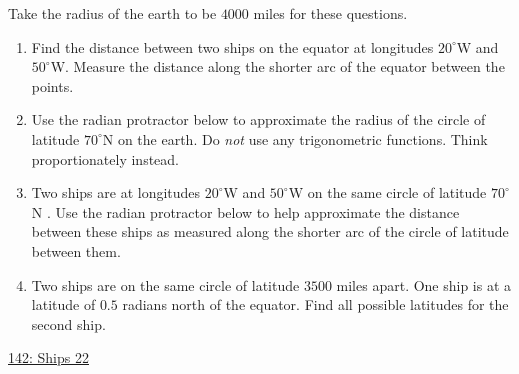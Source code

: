 \documentclass{ximera}
\begin{document}
\begin{question} \label{QPPPdfrrr3r54g}
Take the radius of the earth to be $4000$ miles for these questions.

\begin{enumerate}
\item Find the distance between two ships on the equator at longitudes $20^\circ$W and $50^\circ$W. Measure the distance along the shorter arc of the equator between the points. %

\item Use the radian protractor below to approximate the radius of the circle of latitude $70^\circ$N on the earth. Do \emph{not} use any trigonometric functions. Think proportionately instead.

\item Two ships are at longitudes $20^\circ$W and $50^\circ$W on the same circle of latitude $70^\circ$N . Use the radian protractor below to help approximate the distance between these ships as measured along the shorter arc of the circle of latitude between them.

\item Two ships are on the same circle of latitude $3500$ miles apart. One ship is at a latitude of $0.5$ radians north of the equator. Find all possible latitudes for the second ship. %
 
 
\end{enumerate}

\begin{onlineOnly}
    \begin{center}
\end{center}

\href{https://www.desmos.com/calculator/fmjbqszyge}{142: Ships 22}

\end{onlineOnly}
\end{question}
\end{document}
